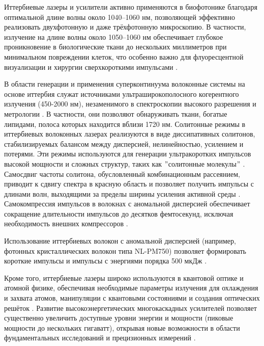 \documentclass[12pt]{article}
\begin{document}
Иттербиевые лазеры и усилители активно применяются в биофотонике благодаря оптимальной длине волны около 1040–1060 нм,
позволяющей эффективно реализовать двухфотонную \cite{wang2019926, kim2012two, perillo2016deep, karpf2016two} и даже
трёхфотонную \cite{toda2017temporal, moritomo2020multi, klioutchnikov2023three} микроскопию. В частности, излучение
на длине волны около 1050–1060 нм обеспечивает глубокое проникновение в биологические ткани до нескольких миллиметров
при минимальном повреждении клеток, что особенно важно для флуоресцентной визуализации и хирургии сверхкороткими
импульсами \cite{horton2013vivo, zipfel2003nonlinear}.

В области генерации и применения суперконтинуума волоконные системы на основе иттербия служат источниками
ультраширокополосного когерентного излучения (450-2000 нм), незаменимого в спектроскопии высокого разрешения
и метрологии \cite{dudley2006supercontinuum}.
В частности, они позволяют обнаруживать ткани, богатые липидами,
полоса которых находится вблизи 1720 нм. Солитонные режимы в иттербиевых волоконных лазерах реализуются в виде
диссипативных солитонов, стабилизируемых
балансом между дисперсией, нелинейностью, усилением и потерями. Эти режимы используются для генерации ультракоротких
импульсов высокой мощности и сложных структур, таких как \("\)солитонные молекулы\("\)
\cite{grelu2012dissipative, grelu2024solitary}. Самосдвиг частоты солитона, обусловленный комбинационным рассеянием,
приводит к сдвигу спектра в красную область и
позволяет получить импульсы с длинами волн, выходящими за пределы ширины усиления активной среды
\cite{han2021spectral}. Самокомпрессия импульсов в волокнах с аномальной дисперсией обеспечивает сокращение
длительности импульсов до десятков фемтосекунд, исключая необходимость внешних компрессоров
\cite{gaida2015self, giree2015high}.

Использование иттербиевых волокон с аномальной дисперсией (например, фотонных кристаллических волокон типа NL-PM750)
позволяет формировать короткие импульсы \cite{zhang2013sub, kurita2011dispersion, hou2018sub} и импульсы с энергиями
порядка 500 мкДж
\cite{tavella2010fiber}.

Кроме того, иттербиевые лазеры широко используются в квантовой оптике и атомной физике, обеспечивая необходимые
параметры излучения для охлаждения и захвата атомов, манипуляции с квантовыми состояниями и создания оптических
решёток \cite{ludlow2015optical}. Развитие высокоэнергетических многокаскадных усилителей позволяет существенно
увеличить доступные уровни энергии и мощности (пиковые мощности до нескольких гигаватт), открывая новые возможности
в области фундаментальных исследований и прецизионных измерений \cite{eidam2010fiber}.
\end{document}
